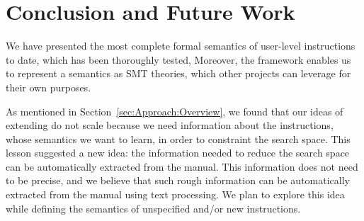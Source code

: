 \section{Conclusion and Future Work}\label{sec:conc}

We have presented the most complete formal semantics of \ISA user-level instructions
to date, which has been thoroughly tested, 
Moreover, the \K framework enables us to represent a semantics as SMT theories,
which other projects can
leverage for their own purposes.

As mentioned in Section~\ref{sec:Approach:Overview}, we found that our ideas of extending \Strata do not scale because we need information about the instructions, whose semantics we want to learn, in order to constraint the search space. This lesson suggested a new idea: the information needed to reduce the search space can be automatically extracted from the manual. This  information does not need to be precise, and we believe that such rough information can be automatically extracted from the manual using text processing.  We plan to explore this idea while defining the semantics of unspecified and/or new instructions.



 


   
